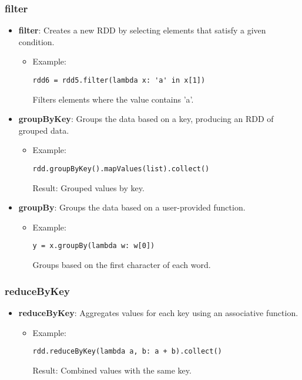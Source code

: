 \documentclass[12pt]{article}
\begin{document}
\subsubsection*{filter}
\begin{itemize}
    \item \textbf{filter}: Creates a new RDD by selecting elements that satisfy a given condition.
    \begin{itemize}
        \item Example:
        \begin{verbatim}
rdd6 = rdd5.filter(lambda x: 'a' in x[1])
        \end{verbatim}
        Filters elements where the value contains 'a'.
    \end{itemize}
\end{itemize}


\begin{itemize}
    \item \textbf{groupByKey}: Groups the data based on a key, producing an RDD of grouped data.
    \begin{itemize}
        \item Example:
        \begin{verbatim}
rdd.groupByKey().mapValues(list).collect()
        \end{verbatim}
        Result: Grouped values by key.
    \end{itemize}
    \item \textbf{groupBy}: Groups the data based on a user-provided function.
    \begin{itemize}
        \item Example:
        \begin{verbatim}
y = x.groupBy(lambda w: w[0])
        \end{verbatim}
        Groups based on the first character of each word.
    \end{itemize}
\end{itemize}

\subsubsection*{reduceByKey}
\begin{itemize}
    \item \textbf{reduceByKey}: Aggregates values for each key using an associative function.
    \begin{itemize}
        \item Example:
        \begin{verbatim}
rdd.reduceByKey(lambda a, b: a + b).collect()
        \end{verbatim}
        Result: Combined values with the same key.
    \end{itemize}
\end{itemize}
\end{document}
